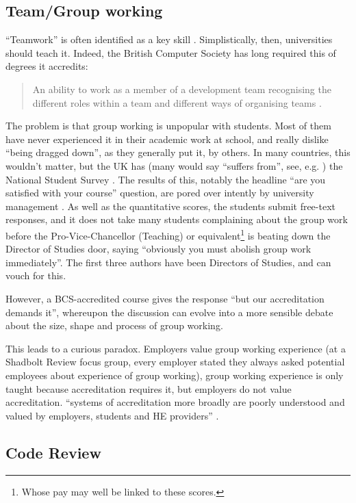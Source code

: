 \documentclass[sigconf,anonymous]{acmart}
\begin{document}
\subsection{Team/Group working}

``Teamwork'' is often identified as a key skill \cite[and many
others]{ArcherDavidson2008}. Simplistically, then, universities should
teach it. Indeed, the British Computer Society has long required this
of degrees it accredits:
\begin{quote} An ability to work as a member of a development team
recognising the different roles within a team and different ways of
organising teams \cite[Requirement 2.3.1]{BCS2018a}.
\end{quote}
The problem is that group working is unpopular with students. Most of
them have never experienced it in their academic work at school, and
really dislike ``being dragged down'', as they generally put it, by
others. In many countries, this wouldn't matter, but the UK has (many
would say ``suffers from'', see, e.g. \cite{Cupples2015a}) the
National Student Survey \cite{OfS2018a}. The results of this, notably
the headline ``are you satisfied with your course'' question, are
pored over intently by university management \cite[Myth
3]{OfS2018a}. As well as the quantitative scores, the students submit
free-text responses, and it does not take many students complaining
about the group work before the Pro-Vice-Chancellor (Teaching) or
equivalent\footnote{Whose pay may well be linked to these scores.} is
beating down the Director of Studies door, saying ``obviously you must
abolish group work immediately''. The first three authors
have been Directors of Studies, and can vouch for this.

However, a BCS-accredited course gives the response ``but our
accreditation demands it'', whereupon the discussion can evolve into a
more sensible debate about the size, shape and process of group
working.
\par This leads to a curious paradox. Employers value group working
experience (at a Shadbolt Review focus group, every employer stated
they always asked potential employees about experience of group
working), group working experience is only taught because
accreditation requires it, but employers do not value accreditation.
``systems of accreditation more broadly are poorly understood and
valued by employers, students and HE providers''
\cite[\P2.12]{Shadbolt2016a}.

\subsection{Code Review}\label{sec:Code}
\end{document}
